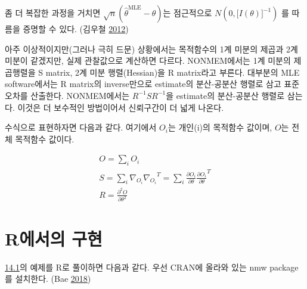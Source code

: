 \documentclass[
  11pt,
  krantz2,
  a4paper]{krantz}
\theoremstyle{definition}
\theoremstyle{definition}
\theoremstyle{definition}
\theoremstyle{remark}
\begin{document}
좀 더 복잡한 과정을 거치면 \(\sqrt{n}({\widehat{\theta}}^{\text{MLE}} - \theta)\)는 점근적으로 \(N(0,\lbrack I(\theta)\rbrack^{- 1})\) 를 따름을 증명할 수 있다. (김우철 \protect\hyperlink{ref-kim}{2012})

아주 이상적이지만(그러나 극히 드문) 상황에서는 목적함수의 1계 미분의 제곱과 2계 미분이 같겠지만, 실제 관찰값으로 계산하면
다르다. NONMEM에서는 1계 미분의 제곱행렬을 S matrix, 2계 미분 행렬(Hessian)을 R matrix라고
부른다. 대부분의 MLE software에서는 R matrix의 inverse만으로 estimate의 분산-공분산 행렬로 삼고
표준오차를 산출한다. NONMEM에서는 \(R^{- 1}SR^{- 1}\)을 estimate의 분산-공분산 행렬로 삼는다. 이것은
더 보수적인 방법이어서 신뢰구간이 더 넓게 나온다.

수식으로 표현하자면 다음과 같다. 여기에서 \(O_{i}\)는 개인(i)의 목적함수 값이며, \(O\)는 전체 목적함수 값이다.

\begin{equation}
\begin{split}
O = \sum_{i}^{}O_{i} \\
S = \sum_{i}^{}{\nabla_{O_{i}}{\nabla_{O_{i}}}^{T}} = \sum_{i}^{}\frac{\partial O_{i}}{\partial\theta}\frac{\partial O_{i}}{\partial\theta}^{T} \\
R = \frac{\partial^{2}O}{\partial\theta^{2}}
\end{split}
\label{eq:o-s-r}
\end{equation}

\hypertarget{ruxc5d0uxc11cuxc758-uxad6cuxd604}{%
\section{R에서의 구현}\label{ruxc5d0uxc11cuxc758-uxad6cuxd604}}

\protect\hyperlink{actual-example}{14.1}의 예제를 R로 풀이하면 다음과 같다. 우선 CRAN에 올라와 있는 nmw package를 설치한다. (Bae \protect\hyperlink{ref-R-nmw}{2018})
\end{document}
